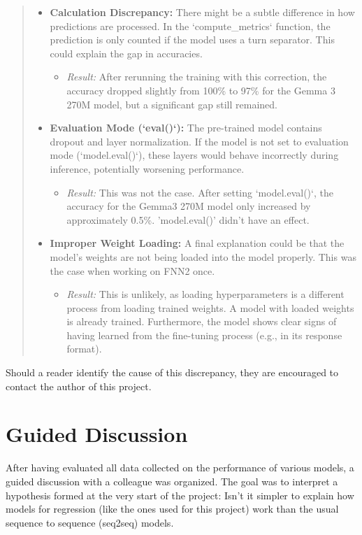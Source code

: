 \documentclass{article}
\begin{document}
\begin{quote}
{\begin{itemize}
    \item \textbf{Calculation Discrepancy:} There might be a subtle difference in how predictions are processed. In the `compute\_metrics` function, the prediction is only counted if the model uses a turn separator. This could explain the gap in accuracies.
        \begin{itemize}
            \item \textit{Result:} After rerunning the training with this correction, the accuracy dropped slightly from 100\% to 97\% for the Gemma 3 270M model, but a significant gap still remained.
        \end{itemize}

    \item \textbf{Evaluation Mode (`eval()`):} The pre-trained model contains dropout and layer normalization. If the model is not set to evaluation mode (`model.eval()`), these layers would behave incorrectly during inference, potentially worsening performance.
        \begin{itemize}
            \item \textit{Result:} This was not the case. After setting `model.eval()`, the accuracy for the Gemma3 270M model only increased by approximately 0.5\%. 'model.eval()' didn't have an effect.
        \end{itemize}

    \item \textbf{Improper Weight Loading:} A final explanation could be that the model's weights are not being loaded into the model properly. This was the case when working on FNN2 once.
        \begin{itemize}
            \item \textit{Result:} This is unlikely, as loading hyperparameters is a different process from loading trained weights. A model with loaded weights is already trained. Furthermore, the model shows clear signs of having learned from the fine-tuning process (e.g., in its response format).
        \end{itemize}
\end{itemize}
}
\end{quote}
Should a reader identify the cause of this discrepancy, they are encouraged to contact the author of this project.

\section{Guided Discussion}
After having evaluated all data collected on the performance of various models, a guided discussion with a colleague was organized. The goal was to interpret a hypothesis formed at the very start of the project: Isn't it simpler to explain how models for regression (like the ones used for this project) work than the usual sequence to sequence (seq2seq) models.
\end{document}
